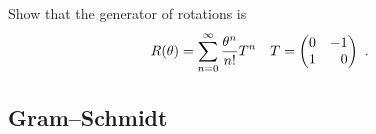 \documentclass[12pt]{article}
\begin{document}
\begin{exercise}
Show that the generator of rotations is
\begin{align}
    R(\theta) &= \sum_{n=0}^\infty \frac{\theta^n}{n!} T^n
    &
    T=
    \begin{pmatrix}
        0 & -1\\
        1 & \pp 0
    \end{pmatrix} \ .
\end{align}
\end{exercise}



\subsection{Gram--Schmidt}
\end{document}
